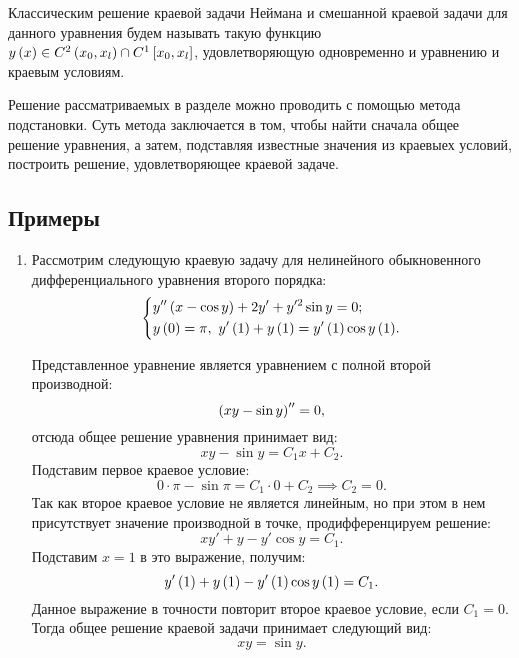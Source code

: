 	Классическим решение краевой задачи Неймана и смешанной краевой задачи для данного уравнения будем называть такую функцию $y \left( x \right) \in C^{2} \left( x_0, x_l \right) \cap C^{1} \left[ x_0, x_l \right]$, удовлетворяющую одновременно и уравнению и краевым условиям.

	Решение рассматриваемых в разделе можно проводить с помощью метода подстановки. Суть метода заключается в том, чтобы найти сначала общее решение уравнения, а затем, подставляя известные значения из краевыех условий, построить решение, удовлетворяющее краевой задаче.

	\subsection{Примеры}

		\begin{enumerate}
			\item Рассмотрим следующую краевую задачу для нелинейного обыкновенного дифференциального уравнения второго порядка:
				\[ \left\lbrace \begin{aligned} 
					&y'' \left( x - \cos{y} \right) + 2y' + y'^2 \sin{y} = 0; \\ 
					&y\left( 0 \right) = \pi, ~ y'\left( 1 \right) + y\left( 1 \right) = y'\left( 1 \right) \cos{y \left( 1 \right) }.
				 \end{aligned} \right. \]

				Представленное уравнение является уравнением с полной второй производной:
				\[ \left( xy - \sin{y} \right)'' = 0, \]
				отсюда общее решение уравнения принимает вид:
				\[ xy - \sin{y} = C_1 x + C_2. \]
				Подставим первое краевое условие:
				\[ 0 \cdot \pi - \sin{\pi} = C_1 \cdot 0 + C_2 \implies C_2 = 0. \]
				Так как второе краевое условие не является линейным, но при этом в нем присутствует значение производной в точке, продифференцируем решение:
				\[ xy' + y - y' \cos{y} = C_1. \]
				Подставим $x = 1$ в это выражение, получим:
				\[ y' \left( 1 \right) + y \left( 1 \right) - y' \left( 1 \right) \cos{y \left( 1 \right) } = C_1. \]
				Данное выражение в точности повторит второе краевое условие, если $C_1 = 0$. Тогда общее решение краевой задачи принимает следующий вид:
				\[ xy = \sin{y}. \]


\end{enumerate}
